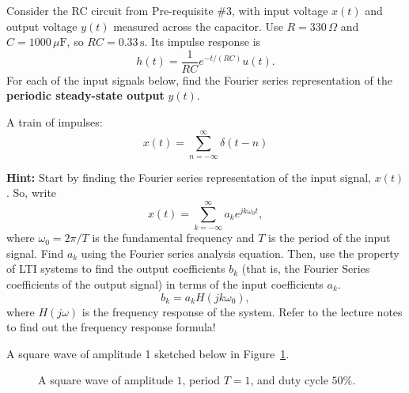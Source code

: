 \documentclass{ee102_pset}
\author{\rule{3cm}{0.4pt}} %
\begin{document}
Consider the RC circuit from Pre-requisite \#3, with input voltage
$x(t)$ and output voltage $y(t)$ measured across the capacitor. Use
$R=330\,\Omega$ and $C=1000\,\mu\mathrm{F}$, so $RC=0.33\,\mathrm{s}$.
Its impulse response is
\[
h(t)=\frac{1}{RC}e^{-t/(RC)}u(t).
\]
For each of the input signals below, find the Fourier series representation
of the \textbf{periodic steady-state output} $y(t)$.

\problempart[20 points] A train of impulses:
\[
x(t) = \sum_{n=-\infty}^{\infty} \delta(t - n)
\]


\textbf{Hint:} Start by finding the Fourier series representation of the input signal, $x(t)$. So, write
\[ x(t) = \sum_{k=-\infty}^{\infty} a_k e^{jk\omega_0 t}, \]
where $\omega_0 = 2\pi/T$ is the fundamental frequency and $T$ is the period of the input signal. Find $a_k$ using the Fourier series analysis equation. Then, use the property of LTI systems to find the output coefficients $b_k$ (that is, the Fourier Series coefficients of the output signal) in terms of the input coefficients $a_k$.
\[
b_k = a_k H(jk\omega_0),
\]
where $H(j\omega)$ is the frequency response of the system. Refer to the lecture notes to find out the frequency response formula!

\problempart[30 points] A square wave of amplitude 1 sketched below in Figure~\ref{fig:square_wave}.
\begin{figure}[h]
  \centering
\caption{A square wave of amplitude $1$, period $T=1$, and duty cycle $50\%$.}
\label{fig:square_wave}


\end{figure}
\end{document}
